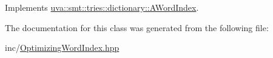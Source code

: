Implements \hyperlink{classuva_1_1smt_1_1tries_1_1dictionary_1_1_a_word_index_a689b450039f29db04b29824b962afd9d}{uva\+::smt\+::tries\+::dictionary\+::\+A\+Word\+Index}.



The documentation for this class was generated from the following file\+:\begin{DoxyCompactItemize}
\item 
inc/\hyperlink{_optimizing_word_index_8hpp}{Optimizing\+Word\+Index.\+hpp}\end{DoxyCompactItemize}
